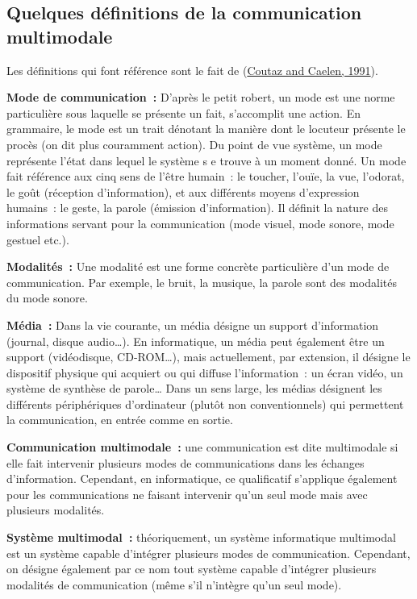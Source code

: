 \documentclass[
]{book}
\begin{document}
\hypertarget{quelques-duxe9finitions-de-la-communication-multimodale}{%
\subsection{Quelques définitions de la communication multimodale}\label{quelques-duxe9finitions-de-la-communication-multimodale}}

Les définitions qui font référence sont le fait de (\protect\hyperlink{ref-coutaz1991taxonomy}{Coutaz and Caelen, 1991}).

\textbf{Mode de communication~:}
D'après le petit robert, un mode est une norme
particulière sous laquelle se présente un fait, s'accomplit une action. En
grammaire, le mode est un trait dénotant la manière dont le locuteur
présente le procès (on dit plus couramment action). Du point de vue
système, un mode représente l'état dans lequel le système s e trouve à un
moment donné. Un mode fait référence aux cinq sens de l'être humain~: le
toucher, l'ouïe, la vue, l'odorat, le goût (réception d'information), et
aux différents moyens d'expression humains~: le geste, la parole (émission
d'information). Il définit la nature des informations servant pour la
communication (mode visuel, mode sonore, mode gestuel etc.).

\textbf{Modalités~:}
Une modalité est une forme concrète particulière
d'un mode de communication. Par exemple, le bruit, la musique, la parole
sont des modalités du mode sonore.

\textbf{Média~:}
Dans la vie courante, un média désigne un
support d'information (journal, disque audio\ldots). En informatique, un média
peut également être un support (vidéodisque, CD-ROM\ldots), mais actuellement,
par extension, il désigne le dispositif physique qui acquiert ou qui
diffuse l'information~: un écran vidéo, un système de synthèse de parole\ldots{}
Dans un sens large, les médias désignent les différents périphériques
d'ordinateur (plutôt non conventionnels) qui permettent la communication,
en entrée comme en sortie.

\textbf{Communication multimodale~:}
une communication est dite multimodale si elle
fait intervenir plusieurs modes de communications dans les échanges
d'information. Cependant, en informatique, ce qualificatif s'applique
également pour les communications ne faisant intervenir qu'un seul mode
mais avec plusieurs modalités.

\textbf{Système multimodal~:}
théoriquement, un système informatique
multimodal est un système capable d'intégrer plusieurs modes de
communication. Cependant, on désigne également par ce nom tout système
capable d'intégrer plusieurs modalités de communication (même s'il
n'intègre qu'un seul mode).
\end{document}
